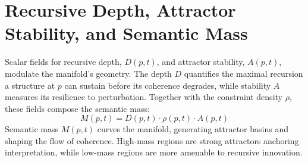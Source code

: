 \section{Recursive Depth, Attractor Stability, and Semantic Mass}

Scalar fields for recursive depth, \(D(p, t)\), and attractor stability, \(A(p, t)\), modulate the manifold's geometry. The depth \(D\) quantifies the maximal recursion a structure at \(p\) can sustain before its coherence degrades, while stability \(A\) measures its resilience to perturbation. Together with the constraint density \(\rho\), these fields compose the semantic mass:
\begin{equation}
M(p, t) = D(p, t) \cdot \rho(p, t) \cdot A(p, t)
\end{equation}
Semantic mass \(M(p,t)\) curves the manifold, generating attractor basins and shaping the flow of coherence. High-mass regions are strong attractors anchoring interpretation, while low-mass regions are more amenable to recursive innovation. 